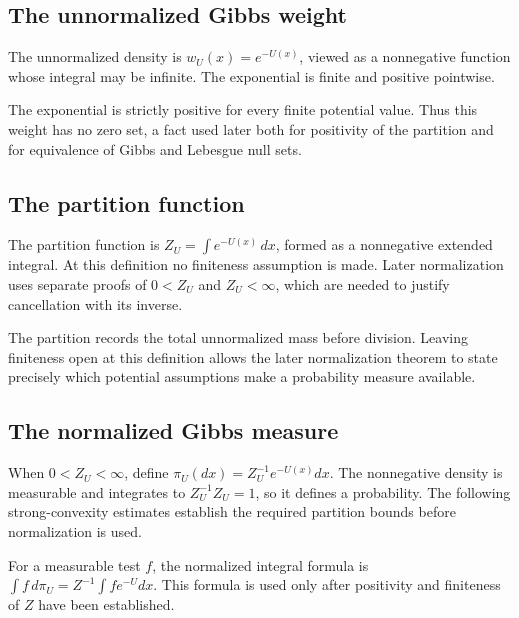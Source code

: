 \documentclass[11pt,a4paper]{report}
\begin{document}
\subsection{\texorpdfstring{The unnormalized Gibbs weight}{The unnormalized Gibbs weight}}
\label{report-step-UnadjustedLangevin-Gibbs-lean-1}


The unnormalized density is \(w_U(x)=e^{-U(x)}\), viewed as a nonnegative function whose integral may be infinite. The exponential is finite and positive pointwise.



The exponential is strictly positive for every finite potential value. Thus this weight has no zero set, a fact used later both for positivity of the partition and for equivalence of Gibbs and Lebesgue null sets.

\subsection{\texorpdfstring{The partition function}{The partition function}}
\label{report-step-UnadjustedLangevin-Gibbs-lean-2}


The partition function is \(Z_U=\int e^{-U(x)}\,dx\), formed as a nonnegative extended integral. At this definition no finiteness assumption is made. Later normalization uses separate proofs of \(0<Z_U\) and \(Z_U<\infty\), which are needed to justify cancellation with its inverse.



The partition records the total unnormalized mass before division. Leaving finiteness open at this definition allows the later normalization theorem to state precisely which potential assumptions make a probability measure available.

\subsection{\texorpdfstring{The normalized Gibbs measure}{The normalized Gibbs measure}}
\label{report-step-UnadjustedLangevin-Gibbs-lean-3}


When \(0<Z_U<\infty\), define \(\pi_U(dx)=Z_U^{-1}e^{-U(x)}dx\). The nonnegative density is measurable and integrates to \(Z_U^{-1}Z_U=1\), so it defines a probability. The following strong-convexity estimates establish the required partition bounds before normalization is used.



For a measurable test \(f\), the normalized integral formula is \(\int f\,d\pi_U=Z^{-1}\int fe^{-U}dx\). This formula is used only after positivity and finiteness of \(Z\) have been established.
\end{document}
